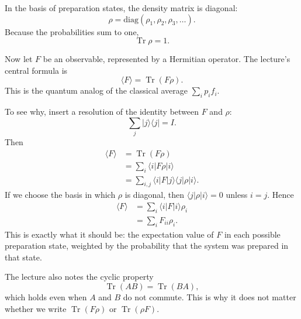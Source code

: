 In the basis of preparation states, the density matrix is diagonal:
\begin{equation}
\rho=
\mathrm{diag}(\rho_1,\rho_2,\rho_3,\ldots) .
\end{equation}
Because the probabilities sum to one,
\begin{equation}
\operatorname{Tr}\rho=1 .
\end{equation}

Now let \(F\) be an observable, represented by a Hermitian operator. The lecture's central formula is
\begin{equation}
\langle F\rangle = \operatorname{Tr}(F\rho) .
\end{equation}
This is the quantum analog of the classical average \(\sum_i p_i f_i\).

To see why, insert a resolution of the identity between \(F\) and \(\rho\):
\begin{equation}
\sum_j |j\rangle\langle j| = I .
\end{equation}
Then
\begin{align}
\langle F\rangle
&=
\operatorname{Tr}(F\rho) \\
&=
\sum_i \langle i|F\rho|i\rangle \\
&=
\sum_{i,j}\langle i|F|j\rangle\langle j|\rho|i\rangle .
\end{align}
If we choose the basis in which \(\rho\) is diagonal, then \(\langle j|\rho|i\rangle=0\) unless \(i=j\). Hence
\begin{align}
\langle F\rangle
&=
\sum_i \langle i|F|i\rangle \rho_i \\
&=
\sum_i F_{ii}\rho_i .
\end{align}
This is exactly what it should be: the expectation value of \(F\) in each possible preparation state, weighted by the probability that the system was prepared in that state.

The lecture also notes the cyclic property
\begin{equation}
\operatorname{Tr}(AB)=\operatorname{Tr}(BA) ,
\end{equation}
which holds even when \(A\) and \(B\) do not commute. This is why it does not matter whether we write \(\operatorname{Tr}(F\rho)\) or \(\operatorname{Tr}(\rho F)\).

